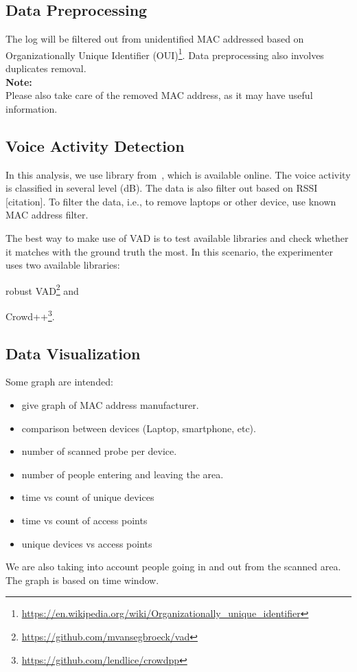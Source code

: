 \documentclass{article}
\begin{document}
\subsection{Data Preprocessing} %
\label{sub:data_preprocessing}
The log will be filtered out from unidentified MAC addressed based on Organizationally Unique Identifier (OUI)\footnote{\url{https://en.wikipedia.org/wiki/Organizationally_unique_identifier}}. Data preprocessing also involves duplicates removal.\\

\noindent
\textbf{Note:}\\
Please also take care of the removed MAC address, as it may have useful information.

\subsection{Voice Activity Detection} %
\label{sub:voice_activity_detection}
In this analysis, we use library from~\cite{thesis070,thesis067}, which is available online. The voice activity is classified in several level (dB). The data is also filter out based on RSSI [citation]. To filter the data, i.e., to remove laptops or other device, use known MAC address filter.

The best way to make use of VAD is to test available libraries and check whether it matches with the ground truth the most. In this scenario, the experimenter uses two available libraries:
	\begin{enumerate*}[label={\alph*)}]
		\item robust VAD\footnote{\url{https://github.com/mvansegbroeck/vad}} and 
		\item Crowd++\footnote{\url{https://github.com/lendlice/crowdpp}}.
	\end{enumerate*}

\subsection{Data Visualization} %
\label{sub:data_visualization}
Some graph are intended:
\begin{itemize}
	\item give graph of MAC address manufacturer.
	\item comparison between devices (Laptop, smartphone, etc).
	\item number of scanned probe per device.
	\item number of people entering and leaving the area.
	\item time vs count of unique devices
	\item time vs count of access points
	\item unique devices vs access points
\end{itemize}
We are also taking into account people going in and out from the scanned area. The graph is based on time window.



{}

\end{document}
